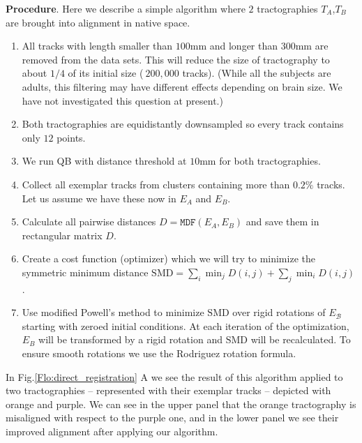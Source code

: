 \documentclass[preprint,authoryear,a4paper,10pt,onecolumn]{elsarticle}
\begin{document}
\textbf{Procedure}. Here we describe a simple algorithm where $2$
tractographies $T_{A}$,$T_{B}$ are brought into alignment in native
space.
\begin{enumerate}
\item All tracks with length smaller than $100$mm and longer than $300$mm
are removed from the data sets. This will reduce the size of tractography
to about $1/4$ of its initial size ($~200,000$ tracks). (While all
the subjects are adults, this filtering may have different effects
depending on brain size. We have not investigated this question at
present.)
\item Both tractographies are equidistantly downsampled so every track contains
only $12$ points. 
\item We run QB with distance threshold at $10$mm for both tractographies.
\item Collect all exemplar tracks from clusters containing more than $0.2\%$
tracks. Let us assume we have these now in $E_{A}$ and $E_{B}$.
\item Calculate all pairwise distances $D=\mathtt{MDF}(E_{A},E_{B})$ and
save them in rectangular matrix $D$. 
\item Create a cost function (optimizer) which we will try to minimize the
symmetric minimum distance $\mathrm{SMD}=\sum_{i}\min_{j}D(i,j)+\sum_{j}\min_{i}D(i,j)$
.
\item Use modified Powell's method \citep{fletcher1987practical} to minimize
$\mathrm{SMD}$ over rigid rotations of $E_{\mathcal{B}}$ starting
with zeroed initial conditions. At each iteration of the optimization,
$E_{B}$ will be transformed by a rigid rotation and $\mathrm{SMD}$
will be recalculated. To ensure smooth rotations we use the Rodriguez
rotation formula.
\end{enumerate}
In Fig.\ref{Flo:direct_registration} A we see the result of this
algorithm applied to two tractographies -- represented with their
exemplar tracks -- depicted with orange and purple. We can see in the
upper panel that the orange tractography is misaligned with respect to
the purple one, and in the lower panel we see their improved alignment
after applying our algorithm.
\end{document}
